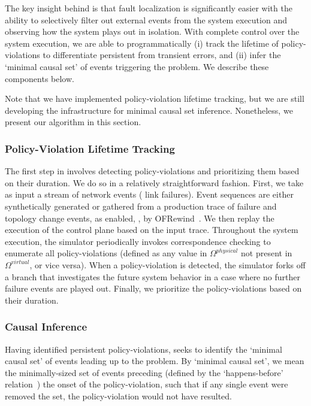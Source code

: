 The key insight behind
\simulator{} is that fault localization is significantly easier with the
ability to selectively filter
out external events from the system execution and observing how the system
plays out in isolation. 
With complete control over the
system execution, we are able to programmatically (i) track the lifetime of
policy-violations to differentiate persistent from transient errors, and (ii)
infer the `minimal causal set' of events triggering the problem. We describe
these components below.

Note that we have implemented policy-violation lifetime tracking, but we are
still developing the infrastructure for minimal causal set inference.
Nonetheless, we present our algorithm in this section.

\subsubsection{Policy-Violation Lifetime Tracking} The first step in
\simulator{} involves detecting policy-violations and prioritizing them based
on their duration.
We do so in a relatively straightforward fashion. First, we take as input
a stream of network events (\eg{} link failures). Event sequences are either
synthetically generated or gathered from a production trace of failure and topology change
events, as enabled, \eg{}, by OFRewind~\cite{ofrewind}. We then replay the execution of the
control plane based on the input trace. Throughout the system execution,
the simulator periodically invokes correspondence checking to enumerate all
policy-violations (defined as any value in $\Omega^{physical}$ not present in
$\Omega^{virtual}$, or vice versa). When a policy-violation is detected,
the simulator forks off a branch that investigates the future system behavior
in a case where no further failure events are played out. Finally, we
prioritize the policy-violations based on their duration.

\subsubsection{\bf Causal Inference} Having identified persistent
policy-violations, \simulator{} seeks to identify the `minimal causal set' of
events leading up to the problem. By `minimal causal set', we mean
the minimally-sized set of events preceding (defined by the `happens-before'
relation~\cite{Lamport:1978:TCO:359545.359563}) the onset of the policy-violation, such that
if any single event were removed the set, the policy-violation would not have resulted.

